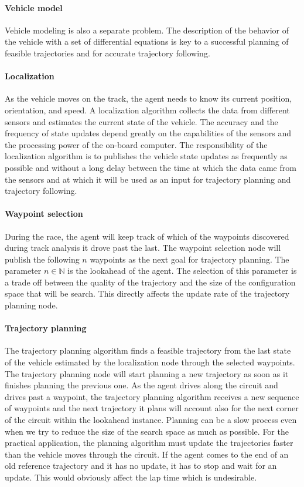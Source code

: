 \paragraph{Vehicle model} Vehicle modeling is also a separate problem. The description of the behavior of the vehicle with a set of differential equations is key to a successful planning of feasible trajectories and for accurate trajectory following.

\paragraph{Localization} As the vehicle moves on the track, the agent needs to know its current position, orientation, and speed. A localization algorithm collects the data from different sensors and estimates the current state of the vehicle. The accuracy and the frequency of state updates depend greatly on the capabilities of the sensors and the processing power of the on-board computer. The responsibility of the localization algorithm is to publishes the vehicle state updates as frequently as possible and without a long delay between the time at which the data came from the sensors and at which it will be used as an input for trajectory planning and trajectory following.

\paragraph{Waypoint selection} During the race, the agent will keep track of which of the waypoints discovered during track analysis it drove past the last. The waypoint selection node will publish the following $n$ waypoints as the next goal for trajectory planning. The parameter $n\in\mathbb{N}$ is the lookahead of the agent. The selection of this parameter is a trade off between the quality of the trajectory and the size of the configuration space that will be search. This directly affects the update rate of the trajectory planning node.

\paragraph{Trajectory planning} The trajectory planning algorithm finds a feasible trajectory from the last state of the vehicle estimated by the localization node through the selected waypoints. The trajectory planning node will start planning a new trajectory as soon as it finishes planning the previous one. As the agent drives along the circuit and drives past a waypoint, the trajectory planning algorithm receives a new sequence of waypoints and the next trajectory it plans will account also for the next corner of the circuit within the lookahead instance. Planning can be a slow process even when we try to reduce the size of the search space as much as possible. For the practical application, the planning algorithm must update the trajectories faster than the vehicle moves through the circuit. If the agent comes to the end of an old reference trajectory and it has no update, it has to stop and wait for an update. This would obviously affect the lap time which is undesirable.

